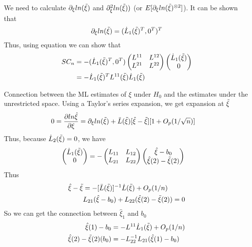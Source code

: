 \documentclass[11pt]{article} %
\begin{document}
	We need to calculate $\partial_{\xi}ln(\Tilde{\xi})$ and $\partial_{\xi}^2 ln(\Tilde{\xi}))$ (or $E[\partial_{\xi}ln(\Tilde{\xi})^{\otimes 2}]$). It can be shown that 
	\begin{align*}
		\partial_{\xi}ln(\Tilde{\xi}) &= (\dot{L}_1(\Tilde{\xi})^T, 0^T)^T \\
	\end{align*} 
	Thus, using equation we can show that
	\begin{align*}
		SC_n &= - (\dot{L}_1(\Tilde{\xi})^T, 0^T) \begin{pmatrix}
			L^{11} & L^{12}\\
			L^{21} & L^{22}\\
		\end{pmatrix}  \begin{pmatrix}
			\dot{L}_1(\Tilde{\xi})\\
			0\\
		\end{pmatrix} \\
		&= -\dot{L}_1(\Tilde{\xi})^T L^{11}(\Tilde{\xi}) \dot{L}_1(\Tilde{\xi})
	\end{align*} 
	
Connection between the ML estimates of $\xi$ under $H_0$ and the estimates under the unrestricted space.
	Using a Taylor's series expansion, we get expansion at $\Tilde{\xi}$
	\begin{align*}
		0  &= \frac{\partial ln \hat{\xi}}{\partial \xi} = \partial_{\xi} ln(\Tilde{\xi}) + \ddot{L}(\Tilde{\xi})[\hat{\xi} - \Tilde{\xi}] [1+ O_p(1/\sqrt{n})]
	\end{align*} 
	Thus, because $\dot{L}_2(\Tilde{\xi}) = 0$, we have
	\begin{align*}
		\begin{pmatrix}
			\dot{L}_1(\Tilde{\xi})\\
			0\\
		\end{pmatrix}   &= - \begin{pmatrix}
			L_{11} & L_{12}\\
			L_{21} & L_{22}\\
		\end{pmatrix} \begin{pmatrix}
			\hat{\xi} - b_0\\
			\hat{\xi}(2) - \Tilde{\xi}(2)\\
		\end{pmatrix}
	\end{align*} 
	Thus
	\begin{align*}
		\hat{\xi} - \Tilde{\xi}  &= - [\ddot{L}(\Tilde{\xi})]^{-1} \dot{L}(\Tilde{\xi}) + O_p(1/n)\\
		& L_{21} (\hat{\xi} - b_0) + L_{22} (\hat{\xi}(2) - \Tilde{\xi}(2)) = 0
	\end{align*} 
	So we can get the connection between $\hat{\xi}_1$ and $b_0$
	\begin{align*}
		\hat{\xi}(1) - b_0  &= - L^{11} \dot{L}_1(\Tilde{\xi}) + O_p(1/n)\\
		\hat{\xi}(2) - \Tilde{\xi}(2)(b_0) & = - L_{22}^{-1}L_{21} (\hat{\xi}(1) - b_0) 
	\end{align*} 
\end{document}
